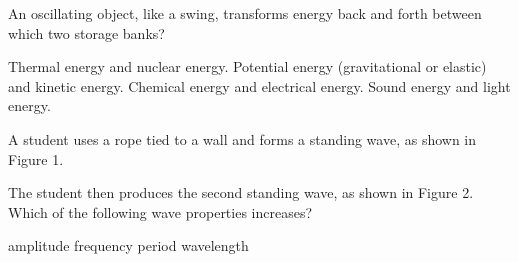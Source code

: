 \documentclass[answers]{exam}
\begin{document}
\begin{questions}


\question
An oscillating object, like a swing, transforms energy back and forth between which two storage banks?

\begin{randomizechoices}
    \choice Thermal energy and nuclear energy.
    \correctchoice Potential energy (gravitational or elastic) and kinetic energy.
    \choice Chemical energy and electrical energy.
    \choice Sound energy and light energy.
\end{randomizechoices}

\question
A student uses a rope tied to a wall and forms a standing wave, as shown in Figure 1.


\begin{EnvUplevel}
\centering
{}
\hspace{2cm}
\end{EnvUplevel}

The student then produces the second standing wave, as shown in Figure 2. Which of the following wave properties increases?

\begin{randomizechoices}
    \choice amplitude
    \correctchoice frequency
    \choice period
    \choice wavelength
\end{randomizechoices}


\end{questions}
\end{document}
